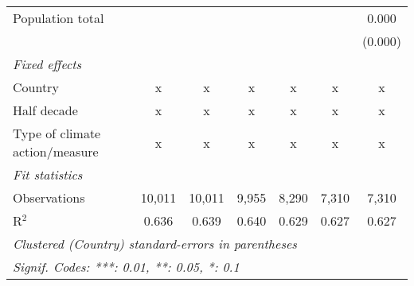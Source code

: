 \begin{tabular}{lcccccc}
   Population total                                                         &             &               &               &              &              & 0.000\\   
                                                                            &             &               &               &              &              & (0.000)\\   
   \emph{Fixed effects}\\
   Country                                                                  & x           & x             & x             & x            & x            & x\\  
   Half decade                                                              & x           & x             & x             & x            & x            & x\\  
   Type of climate action/measure                                           & x           & x             & x             & x            & x            & x\\  
   \midrule \emph{Fit statistics}\\
   Observations                                                             & 10,011      & 10,011        & 9,955         & 8,290        & 7,310        & 7,310\\  
   R$^2$                                                                    & 0.636       & 0.639         & 0.640         & 0.629        & 0.627        & 0.627\\  
   \midrule
   \multicolumn{7}{l}{\emph{Clustered (Country) standard-errors in parentheses}}\\
   \multicolumn{7}{l}{\emph{Signif. Codes: ***: 0.01, **: 0.05, *: 0.1}}\\
\end{tabular}
\par\endgroup


